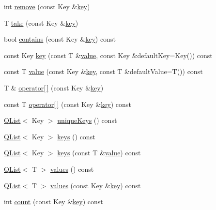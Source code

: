 \begin{DoxyCompactItemize}
\item 
int \hyperlink{class_q_map_af562610e90763fad449dfc130bd18fb8}{remove} (const Key \&\hyperlink{class_q_map_a7ad0c404885c5287fe593849e4bc80d6}{key})
\item 
T \hyperlink{class_q_map_ac6f3e69396c5665d24d8b25bdf4e5ae7}{take} (const Key \&\hyperlink{class_q_map_a7ad0c404885c5287fe593849e4bc80d6}{key})
\item 
bool \hyperlink{class_q_map_ac92f0cafb70425a2d3d5171cf367dd11}{contains} (const Key \&\hyperlink{class_q_map_a7ad0c404885c5287fe593849e4bc80d6}{key}) const 
\item 
const Key \hyperlink{class_q_map_a7ad0c404885c5287fe593849e4bc80d6}{key} (const T \&\hyperlink{class_q_map_ab9c04f61f4abd94439d4431118a238e5}{value}, const Key \&default\+Key=Key()) const 
\item 
const T \hyperlink{class_q_map_ab9c04f61f4abd94439d4431118a238e5}{value} (const Key \&\hyperlink{class_q_map_a7ad0c404885c5287fe593849e4bc80d6}{key}, const T \&default\+Value=T()) const 
\item 
T \& \hyperlink{class_q_map_a69dc3a1b9dde2e59e829a7baa9761bc7}{operator\mbox{[}$\,$\mbox{]}} (const Key \&\hyperlink{class_q_map_a7ad0c404885c5287fe593849e4bc80d6}{key})
\item 
const T \hyperlink{class_q_map_a17e56b01b24614bb30e500f6fffb0cf8}{operator\mbox{[}$\,$\mbox{]}} (const Key \&\hyperlink{class_q_map_a7ad0c404885c5287fe593849e4bc80d6}{key}) const 
\item 
\hyperlink{class_q_list}{Q\+List}$<$ Key $>$ \hyperlink{class_q_map_a741722c285b32c3c6e59b3d5c89b2177}{unique\+Keys} () const 
\item 
\hyperlink{class_q_list}{Q\+List}$<$ Key $>$ \hyperlink{class_q_map_a12b7cde7eb217194ceff17bc44e93a93}{keys} () const 
\item 
\hyperlink{class_q_list}{Q\+List}$<$ Key $>$ \hyperlink{class_q_map_ab0a66ce475c7d00a706c673ba6c36697}{keys} (const T \&\hyperlink{class_q_map_ab9c04f61f4abd94439d4431118a238e5}{value}) const 
\item 
\hyperlink{class_q_list}{Q\+List}$<$ T $>$ \hyperlink{class_q_map_a86b7de4427e1a5e09cd6064d92209fd3}{values} () const 
\item 
\hyperlink{class_q_list}{Q\+List}$<$ T $>$ \hyperlink{class_q_map_ad3b4a80945a3159cde215d40931a509c}{values} (const Key \&\hyperlink{class_q_map_a7ad0c404885c5287fe593849e4bc80d6}{key}) const 
\item 
int \hyperlink{class_q_map_a7576304b0025dbb0f127c655c05377ac}{count} (const Key \&\hyperlink{class_q_map_a7ad0c404885c5287fe593849e4bc80d6}{key}) const 

\end{DoxyCompactItemize}
